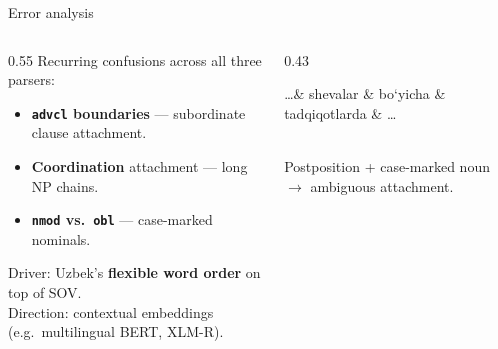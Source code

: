 \documentclass[10pt,aspectratio=169]{beamer}
\begin{document}
\begin{frame}{Error analysis}
   \begin{columns}[T,onlytextwidth]
     \begin{column}{0.55\textwidth}
       Recurring confusions across all three parsers:
       \begin{itemize}
         \item \textbf{\texttt{advcl} boundaries} — subordinate clause attachment.
         \item \textbf{Coordination} attachment — long NP chains.
         \item \textbf{\texttt{nmod} vs.\ \texttt{obl}} — case-marked nominals.
       \end{itemize}
       Driver: Uzbek's \textbf{flexible word order} on top of SOV.\\[0.3em]
       Direction: contextual embeddings (e.g.\ multilingual BERT, XLM-R).
     \end{column}
     \begin{column}{0.43\textwidth}
       \centering
       \begin{dependency}[theme=simple, label style={font=\tiny}]
          \begin{deptext}[column sep=0.25cm]
              \ldots \& shevalar \& bo‘yicha \& tadqiqotlarda \& \ldots\\
          \end{deptext}
       \end{dependency}\\[-0.4em]
       \scriptsize Postposition + case-marked noun $\rightarrow$ ambiguous attachment.
     \end{column}
   \end{columns}
\end{frame}

\end{document}

